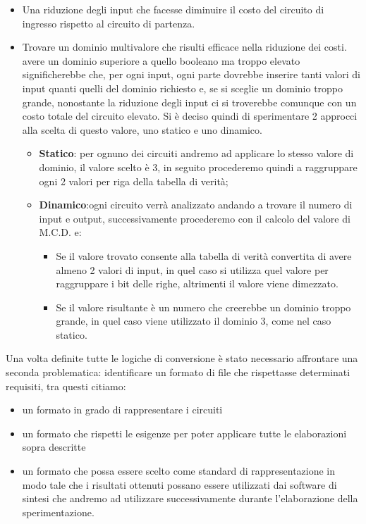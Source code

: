 \documentclass[
]{book}
\providecommand{\tightlist}{%
  \setlength{\itemsep}{0pt}\setlength{\parskip}{0pt}}
\begin{document}
\begin{itemize}
\item
  Una riduzione degli input che facesse diminuire il costo del circuito di ingresso rispetto al circuito di partenza.
\item
  Trovare un dominio multivalore che risulti efficace nella riduzione dei costi. avere un dominio superiore a quello booleano ma troppo elevato significherebbe che, per ogni input, ogni parte dovrebbe inserire tanti valori di input quanti quelli del dominio richiesto e, se si sceglie un dominio troppo grande, nonostante la riduzione degli input ci si troverebbe comunque con un costo totale del circuito elevato. Si è deciso quindi di sperimentare 2 approcci alla scelta di questo valore, uno statico e uno dinamico.

  \begin{itemize}
  \tightlist
  \item
    \textbf{Statico}: per ognuno dei circuiti andremo ad applicare lo stesso valore di dominio, il valore scelto è 3, in seguito procederemo quindi a raggruppare ogni 2 valori per riga della tabella di verità;
  \item
    \textbf{Dinamico}:ogni circuito verrà analizzato andando a trovare il numero di input e output, successivamente procederemo con il calcolo del valore di M.C.D. e:

    \begin{itemize}
    \tightlist
    \item
      Se il valore trovato consente alla tabella di verità convertita di avere almeno 2 valori di input, in quel caso si utilizza quel valore per raggruppare i bit delle righe, altrimenti il valore viene dimezzato.
    \item
      Se il valore risultante è un numero che creerebbe un dominio troppo grande, in quel caso viene utilizzato il dominio 3, come nel caso statico.
    \end{itemize}
  \end{itemize}
\end{itemize}

Una volta definite tutte le logiche di conversione è stato necessario affrontare una seconda problematica: identificare un formato di file che rispettasse determinati requisiti, tra questi citiamo:

\begin{itemize}
\tightlist
\item
  un formato in grado di rappresentare i circuiti
\item
  un formato che rispetti le esigenze per poter applicare tutte le elaborazioni sopra descritte
\item
  un formato che possa essere scelto come standard di rappresentazione in modo tale che i risultati ottenuti possano essere utilizzati dai software di sintesi che andremo ad utilizzare successivamente durante l'elaborazione della sperimentazione.
\end{itemize}
\end{document}
